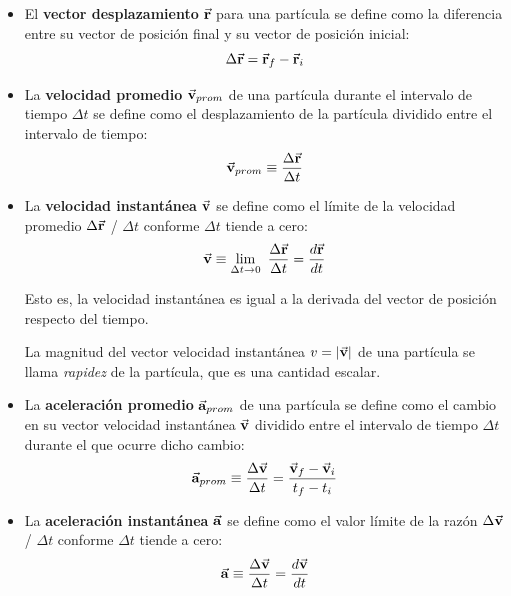     \begin{itemize}
      \item El \textbf{vector desplazamiento} $\vec{\mathbf{r}}$ para una partícula se define como la diferencia entre su vector
      de posición final y su vector de posición inicial:
        \begin{equation*}
          \Delta \vec{\mathbf{r}} = \vec{\mathbf{r}}_{f} - \vec{\mathbf{r}}_{i}
        \end{equation*}

      \item La \textbf{velocidad promedio} $\vec{\mathbf{v}}_{prom}$ de una partícula durante el intervalo de tiempo $\Delta t$ se
      define como el desplazamiento de la partícula dividido entre el intervalo de tiempo:
        \begin{equation*}
          \vec{\mathbf{v}}_{prom} \equiv \frac{\Delta \vec{\mathbf{r}}}{\Delta t}
        \end{equation*}

      \item La \textbf{velocidad instantánea} $\vec{\mathbf{v}}$ se define como el límite de la velocidad promedio $\Delta \vec{\mathbf{r}}$
      / $\Delta t$ conforme $\Delta t$ tiende a cero:
        \begin{equation*}
          \vec{\mathbf{v}} \equiv \lim_{\Delta t \rightarrow 0} \ \frac{\Delta \vec{\mathbf{r}}}{\Delta t} = \frac{d \vec{\mathbf{r}}}{dt}
        \end{equation*}

        \PN Esto es, la velocidad instantánea es igual a la derivada del vector de posición respecto del tiempo.

        \PN La magnitud del vector velocidad instantánea $ v = \lvert\vec{\mathbf{v}}\rvert$ de una partícula se llama \textit{rapidez}
        de la partícula, que es una cantidad escalar.

      \item La \textbf{aceleración promedio} $\vec{\mathbf{a}}_{prom}$ de una partícula se define como el cambio en su vector
      velocidad instantánea $\vec{\mathbf{v}}$ dividido entre el intervalo de tiempo $\Delta t$ durante el que ocurre dicho
      cambio:
        \begin{equation*}
          \vec{\mathbf{a}}_{prom} \equiv \frac{\Delta \vec{\mathbf{v}}}{\Delta t} = \frac{\vec{\mathbf{v}}_{f} - \vec{\mathbf{v}}_{i}}{t_{f} - t_{i}}
        \end{equation*}

      \item La \textbf{aceleración instantánea} $\vec{\mathbf{a}}$ se define como el valor límite de la razón $\Delta \vec{\mathbf{v}}$ /
      $\Delta t$ conforme $\Delta t$ tiende a cero:
        \begin{equation*}
          \vec{\mathbf{a}} \equiv \frac{\Delta \vec{\mathbf{v}}}{\Delta t} = \frac{d \vec{\mathbf{v}}}{dt}
        \end{equation*}
    \end{itemize}

